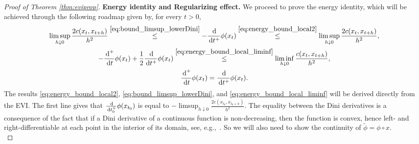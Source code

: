 \documentclass[reqno]{amsart}
\newcounter{results}[section]
\theoremstyle{plain}
\theoremstyle{remark}
\theoremstyle{plain}
\numberwithin{equation}{section}
\theoremstyle{remark}
\newcommand{\tb}{\textbf}
\newcommand{\de}{{\,\rm d}}
\begin{document}
\begin{proof}[Proof of Theorem \ref{thm:eviprop}]
    
    \tb{\bf Energy identity and Regularizing effect.} We proceed to prove the energy identity, which will be achieved through the following roadmap given by, for every $t>0$, 
    \begin{gather*}
         \limsup_{h\downarrow 0}\frac{2c(x_{t},x_{t+h})}{h^2} \stackrel{\eqref{eq:bound_limsup_lowerDini}}{\le}  -\frac{\de}{\de t^+}\phi(x_{t}) \stackrel{\eqref{eq:energy_bound_local2}}{\le} \limsup_{h\downarrow 0}\frac{2c(x_{t},x_{t+h})}{h^2}, \\
         -\frac{\de^+}{\de t}\phi(x_{t})+\frac{1}{2}\frac{\de}{\de t^+}\phi(x_{t}) \stackrel{\eqref{eq:energy_bound_local_liminf}}{\le}  \liminf_{h\downarrow 0}\frac{c(x_{t},x_{t+h})}{h^2},\\
         \frac{\de^+}{\de t}\phi(x_{t}) = \frac{\de}{\de t^+}\phi(x_{t}).
    \end{gather*}
The results \eqref{eq:energy_bound_local2}, \eqref{eq:bound_limsup_lowerDini},  and  \eqref{eq:energy_bound_local_liminf} will be derived directly from the EVI. The first line gives that $\frac{\de}{\de t_0^+}\phi(x_{t_0})$ is equal to $-\limsup_{h\downarrow 0}\frac{2c(x_{t_0},x_{t_0+h})}{h^2}$. The equality between the Dini derivatives is a consequence of the fact that if a Dini derivative of a continuous
function is non-decreasing, then the function is convex, hence left- and right-differentiable at each point in the interior of its domain, see, e.g.,~\cite[Lemma 1]{BruOstr62}. So we will also need to show the continuity of $\tilde{\phi}=\phi \circ x$.\\ 



\end{proof}
\end{document}
